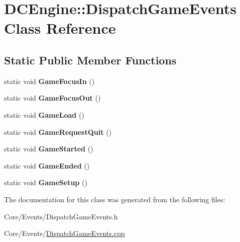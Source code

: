 \hypertarget{classDCEngine_1_1DispatchGameEvents}{\section{D\-C\-Engine\-:\-:Dispatch\-Game\-Events Class Reference}
\label{classDCEngine_1_1DispatchGameEvents}
}
\subsection*{Static Public Member Functions}
\begin{DoxyCompactItemize}
\item 
\hypertarget{classDCEngine_1_1DispatchGameEvents_a3eb1cb43d059358e2796477c8e409e9d}{static void {\bfseries Game\-Focus\-In} ()}\label{classDCEngine_1_1DispatchGameEvents_a3eb1cb43d059358e2796477c8e409e9d}

\item 
\hypertarget{classDCEngine_1_1DispatchGameEvents_a5a498b3d1d6fd33a5e5522c013213bd5}{static void {\bfseries Game\-Focus\-Out} ()}\label{classDCEngine_1_1DispatchGameEvents_a5a498b3d1d6fd33a5e5522c013213bd5}

\item 
\hypertarget{classDCEngine_1_1DispatchGameEvents_ac60b055051d3a81eef85e521aaac14e0}{static void {\bfseries Game\-Load} ()}\label{classDCEngine_1_1DispatchGameEvents_ac60b055051d3a81eef85e521aaac14e0}

\item 
\hypertarget{classDCEngine_1_1DispatchGameEvents_aac5e1417f53d66f2a7aeb1212d9c875c}{static void {\bfseries Game\-Request\-Quit} ()}\label{classDCEngine_1_1DispatchGameEvents_aac5e1417f53d66f2a7aeb1212d9c875c}

\item 
\hypertarget{classDCEngine_1_1DispatchGameEvents_aad7d721d62ffc95a0c66147c91a8ddea}{static void {\bfseries Game\-Started} ()}\label{classDCEngine_1_1DispatchGameEvents_aad7d721d62ffc95a0c66147c91a8ddea}

\item 
\hypertarget{classDCEngine_1_1DispatchGameEvents_ad63bd9040d54088bce0b8796c0fd2df8}{static void {\bfseries Game\-Ended} ()}\label{classDCEngine_1_1DispatchGameEvents_ad63bd9040d54088bce0b8796c0fd2df8}

\item 
\hypertarget{classDCEngine_1_1DispatchGameEvents_a4114723498ea290b2630daf22641b03d}{static void {\bfseries Game\-Setup} ()}\label{classDCEngine_1_1DispatchGameEvents_a4114723498ea290b2630daf22641b03d}

\end{DoxyCompactItemize}


The documentation for this class was generated from the following files\-:\begin{DoxyCompactItemize}
\item 
Core/\-Events/Dispatch\-Game\-Events.\-h\item 
Core/\-Events/\hyperlink{DispatchGameEvents_8cpp}{Dispatch\-Game\-Events.\-cpp}\end{DoxyCompactItemize}

